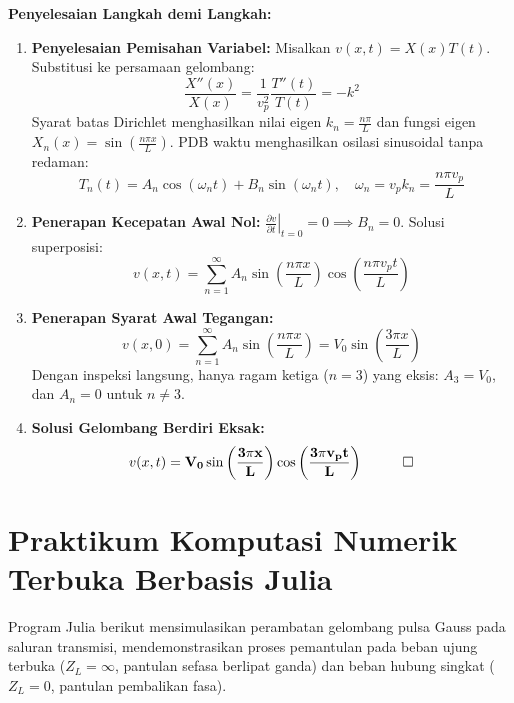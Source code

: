 \documentclass[11pt,a4paper]{article}
\theoremstyle{definition}
\begin{document}
\noindent\textbf{Penyelesaian Langkah demi Langkah:}
\begin{enumerate}[leftmargin=*]
    \item \textbf{Penyelesaian Pemisahan Variabel:}
    Misalkan $v(x, t) = X(x) T(t)$. Substitusi ke persamaan gelombang:
    \begin{equation*}
        \frac{X''(x)}{X(x)} = \frac{1}{v_p^2} \frac{T''(t)}{T(t)} = -k^2
    \end{equation*}
    Syarat batas Dirichlet menghasilkan nilai eigen $k_n = \frac{n\pi}{L}$ dan fungsi eigen $X_n(x) = \sin\left(\frac{n\pi x}{L}\right)$.
    PDB waktu menghasilkan osilasi sinusoidal tanpa redaman:
    \begin{equation*}
        T_n(t) = A_n \cos(\omega_n t) + B_n \sin(\omega_n t), \quad \omega_n = v_p k_n = \frac{n\pi v_p}{L}
    \end{equation*}
    
    \item \textbf{Penerapan Kecepatan Awal Nol:}
    $\left.\frac{\partial v}{\partial t}\right|_{t=0} = 0 \implies B_n = 0$. Solusi superposisi:
    \begin{equation*}
        v(x, t) = \sum_{n=1}^{\infty} A_n \sin\left(\frac{n\pi x}{L}\right) \cos\left(\frac{n\pi v_p t}{L}\right)
    \end{equation*}
    
    \item \textbf{Penerapan Syarat Awal Tegangan:}
    \begin{equation*}
        v(x, 0) = \sum_{n=1}^{\infty} A_n \sin\left(\frac{n\pi x}{L}\right) = V_0 \sin\left(\frac{3\pi x}{L}\right)
    \end{equation*}
    Dengan inspeksi langsung, hanya ragam ketiga ($n = 3$) yang eksis: $A_3 = V_0$, dan $A_n = 0$ untuk $n \ne 3$.
    
    \item \textbf{Solusi Gelombang Berdiri Eksak:}
    \begin{equation*}
        v(x, t) = \mathbf{V_0 \sin\left(\frac{3\pi x}{L}\right) \cos\left(\frac{3\pi v_p t}{L}\right)} \quad \qed
    \end{equation*}
\end{enumerate}

\section{Praktikum Komputasi Numerik Terbuka Berbasis Julia}

Program Julia berikut mensimulasikan perambatan gelombang pulsa Gauss pada saluran transmisi, mendemonstrasikan proses pemantulan pada beban ujung terbuka ($Z_L = \infty$, pantulan sefasa berlipat ganda) dan beban hubung singkat ($Z_L = 0$, pantulan pembalikan fasa).
\end{document}
